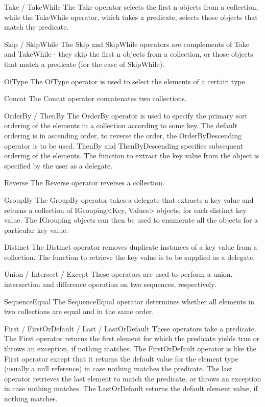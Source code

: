     Take / TakeWhile
      The Take operator selects the first n objects from a collection, while the TakeWhile operator, which takes a predicate, selects those objects that match the predicate.

    Skip / SkipWhile
      The Skip and SkipWhile operators are complements of Take and TakeWhile - they skip the first n objects from a collection, or those objects that match a predicate (for the case of SkipWhile).

    OfType
      The OfType operator is used to select the elements of a certain type.

    Concat
      The Concat operator concatenates two collections.

    OrderBy / ThenBy
      The OrderBy operator is used to specify the primary sort ordering of the elements in a collection according to some key. The default ordering is in ascending order, to reverse the order, the OrderByDescending operator is to be used. ThenBy and ThenByDescending specifies subsequent ordering of the elements. The function to extract the key value from the object is specified by the user as a delegate.

    Reverse
      The Reverse operator reverses a collection.

    GroupBy
      The GroupBy operator takes a delegate that extracts a key value and returns a collection of IGrouping<Key, Values> objects, for each distinct key value. The IGrouping objects can then be used to enumerate all the objects for a particular key value.

    Distinct
      The Distinct operator removes duplicate instances of a key value from a collection. The function to retrieve the key value is to be supplied as a delegate.

    Union / Intersect / Except
      These operators are used to perform a union, intersection and difference operation on two sequences, respectively.

    SequenceEqual
      The SequenceEqual operator determines whether all elements in two collections are equal and in the same order.

    First / FirstOrDefault / Last / LastOrDefault
      These operators take a predicate. The First operator returns the first element for which the predicate yields true or throws an exception, if nothing matches. The FirstOrDefault operator is like the First operator except that it returns the default value for the element type (usually a null reference) in case nothing matches the predicate. The last operator retrieves the last element to match the predicate, or throws an exception in case nothing matches. The LastOrDefault returns the default element value, if nothing matches.

